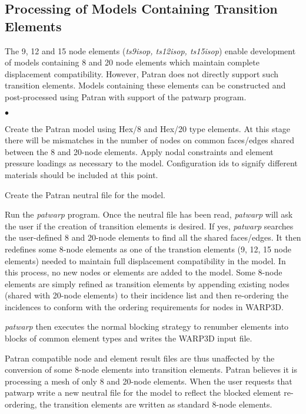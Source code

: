 \documentclass[11pt]{report}
\numberwithin{equation}{section}
\newcommand{\patwarp}{\textit{patwarp }}
\newcommand{\squishlist}{
 \begin{list}{$\bullet$}
  { \setlength{\itemsep}{0pt}
     \setlength{\parsep}{3pt}
     \setlength{\topsep}{3pt}
     \setlength{\partopsep}{0pt}
     \setlength{\leftmargin}{1.5em}
     \setlength{\labelwidth}{1em}
     \setlength{\labelsep}{0.5em} } }
\newcommand{\squishend}{
  \end{list}  }
\begin{document}
\subsection{Processing of Models Containing Transition Elements}
\noindent The 9, 12 and 15 node elements (\textit{ts9isop, ts12isop, ts15isop}) enable development
of models containing 8 and 20 node elements which maintain complete displacement
compatibility. However, Patran does not directly support such transition
elements. Models containing these elements can be constructed and post-processed
using Patran with support of the patwarp program.

\squishlist
\item Create the Patran model using Hex/8 and Hex/20 type elements. At
this stage there will be mismatches in the number of nodes on common faces/edges
shared between the 8 and 20-node elements. Apply nodal constraints and element
pressure loadings as necessary to the model. Configuration ids to signify
different materials should be included at this point.

\item Create the Patran neutral file for the model.

\item Run the \textit{patwarp} program. Once the neutral file has been read,
\patwarp will ask the user if the creation of transition elements is
desired. If yes, \patwarp searches the user-defined 8 and 20-node elements to
find all the shared faces/edges. It then redefines some 8-node elements as one of
the transtion elements (9, 12, 15 node elements) needed to maintain full
displacement compatibility in the model. In this process, no new nodes or
elements are added to the model. Some 8-node elements are simply refined as
transition elements by appending existing nodes (shared with 20-node elements)
to their incidence list and then re-ordering the incidences to conform with the
ordering requirements for nodes in WARP3D.

\item \textit{patwarp} then executes the normal blocking strategy to renumber
elements into blocks of common element types and writes the WARP3D input file.

\item Patran compatible node and element result files are thus
unaffected by the conversion of some 8-node elements into transition elements.
Patran believes it is processing a mesh of only 8 and 20-node elements. When the
user requests that patwarp write a new neutral file for the model to reflect the
blocked element re-ordering, the transition elements are written as standard
8-node elements.
\squishend
\end{document}
